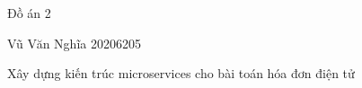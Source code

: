 Đồ án 2




Vũ Văn Nghĩa 20206205







Xây dựng kiến trúc microservices cho bài toán hóa đơn điện tử



